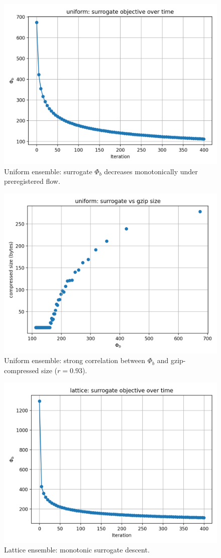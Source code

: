 \documentclass[11pt]{article}
\begin{document}
\begin{figure}[h!]
  \centering
  \includegraphics[width=0.7\linewidth]{figures/uniform_phib_vs_iter.png}
  \caption{Uniform ensemble: surrogate $\Phi_b$ decreases monotonically under preregistered flow.}
  \label{fig:uniform_iter}
\end{figure}

\begin{figure}[h!]
  \centering
  \includegraphics[width=0.7\linewidth]{figures/uniform_phib_vs_compressed.png}
  \caption{Uniform ensemble: strong correlation between $\Phi_b$ and gzip-compressed size ($r=0.93$).}
  \label{fig:uniform_corr}
\end{figure}

\begin{figure}[h!]
  \centering
  \includegraphics[width=0.7\linewidth]{figures/lattice_phib_vs_iter.png}
  \caption{Lattice ensemble: monotonic surrogate descent.}
  \label{fig:lattice_iter}
\end{figure}
\end{document}
